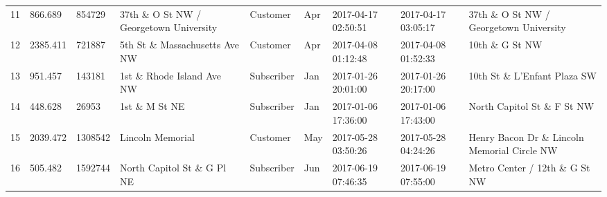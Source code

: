 \documentclass[11pt]{article}
\begin{document}
\begin{tabular}{r|llllllll}
	11 &  866.689                                                &  854729                                                 & 37th \& O St NW / Georgetown University                & Customer                                                & Apr                                                     & 2017-04-17 02:50:51                                     & 2017-04-17 03:05:17                                     & 37th \& O St NW / Georgetown University               \\
	12 & 2385.411                                                &  721887                                                 & 5th St \& Massachusetts Ave NW                         & Customer                                                & Apr                                                     & 2017-04-08 01:12:48                                     & 2017-04-08 01:52:33                                     & 10th \& G St NW                                       \\
	13 &  951.457                                                &  143181                                                 & 1st \& Rhode Island Ave NW                             & Subscriber                                              & Jan                                                     & 2017-01-26 20:01:00                                     & 2017-01-26 20:17:00                                     & 10th St \& L'Enfant Plaza SW                          \\
	14 &  448.628                                                &   26953                                                 & 1st \& M St NE                                         & Subscriber                                              & Jan                                                     & 2017-01-06 17:36:00                                     & 2017-01-06 17:43:00                                     & North Capitol St \& F St NW                           \\
	15 & 2039.472                                              & 1308542                                               & Lincoln Memorial                                      & Customer                                              & May                                                   & 2017-05-28 03:50:26                                   & 2017-05-28 04:24:26                                   & Henry Bacon Dr \& Lincoln Memorial Circle NW        \\
	16 &  505.482                                                & 1592744                                                 & North Capitol St \& G Pl NE                            & Subscriber                                              & Jun                                                     & 2017-06-19 07:46:35                                     & 2017-06-19 07:55:00                                     & Metro Center / 12th \& G St NW                        \\

\end{tabular}
\end{document}
